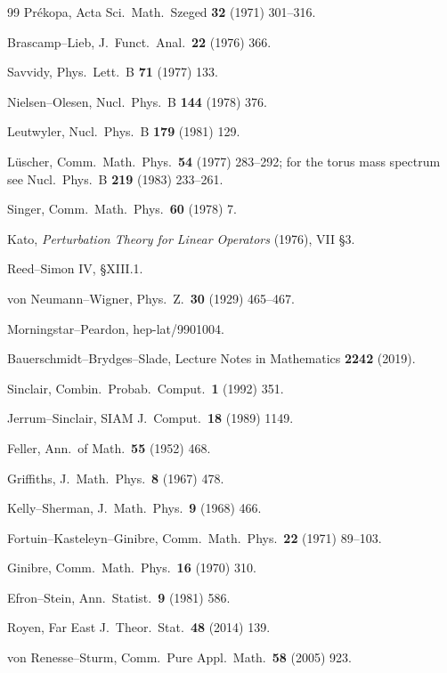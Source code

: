 {\begin{thebibliography}{99}
 Pr\'ekopa, Acta Sci.\ Math.\ Szeged \textbf{32} (1971) 301--316.

 Brascamp--Lieb, J.\ Funct.\ Anal.\ \textbf{22} (1976) 366.

 Savvidy, Phys.\ Lett.\ B \textbf{71} (1977) 133.

 Nielsen--Olesen, Nucl.\ Phys.\ B \textbf{144} (1978) 376.

 Leutwyler, Nucl.\ Phys.\ B \textbf{179} (1981) 129.

 L\"uscher, Comm.\ Math.\ Phys.\ \textbf{54} (1977) 283--292; for the torus
  mass spectrum see Nucl.\ Phys.\ B \textbf{219} (1983) 233--261.

 Singer, Comm.\ Math.\ Phys.\ \textbf{60} (1978) 7.

 Kato, \emph{Perturbation Theory for Linear Operators} (1976), VII \S3.

 Reed--Simon IV, \S XIII.1.

 von Neumann--Wigner, Phys.\ Z.\ \textbf{30} (1929) 465--467.

 Morningstar--Peardon, hep-lat/9901004.

 Bauerschmidt--Brydges--Slade, Lecture Notes in Mathematics \textbf{2242} (2019).

 Sinclair, Combin.\ Probab.\ Comput.\ \textbf{1} (1992) 351.

 Jerrum--Sinclair, SIAM J.\ Comput.\ \textbf{18} (1989) 1149.

 Feller, Ann.\ of Math.\ \textbf{55} (1952) 468.

 Griffiths, J.\ Math.\ Phys.\ \textbf{8} (1967) 478.

 Kelly--Sherman, J.\ Math.\ Phys.\ \textbf{9} (1968) 466.

 Fortuin--Kasteleyn--Ginibre, Comm.\ Math.\ Phys.\ \textbf{22} (1971) 89--103.

 Ginibre, Comm.\ Math.\ Phys.\ \textbf{16} (1970) 310.

 Efron--Stein, Ann.\ Statist.\ \textbf{9} (1981) 586.

 Royen, Far East J.\ Theor.\ Stat.\ \textbf{48} (2014) 139.

 von Renesse--Sturm, Comm.\ Pure Appl.\ Math.\ \textbf{58} (2005) 923.


\end{thebibliography}}
